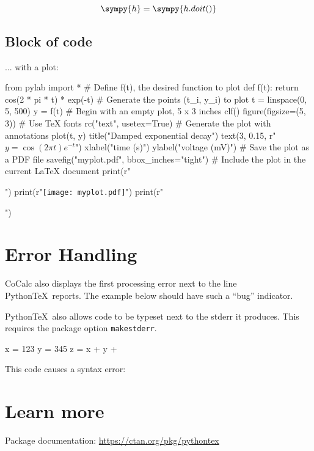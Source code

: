\documentclass{scrartcl}
\newcommand{\pytex}{Python\TeX}
\begin{document}
\[\sympy{h}=\sympy{h.doit()}\]

\pagebreak

\subsection{Block of code}

... with a plot:

\begin{pycode}
from pylab import *
# Define f(t), the desired function to plot
def f(t):
  return cos(2 * pi * t) * exp(-t)
# Generate the points (t_i, y_i) to plot
t = linspace(0, 5, 500)
y = f(t)
# Begin with an empty plot, 5 x 3 inches
clf()
figure(figsize=(5, 3))
# Use TeX fonts
rc("text", usetex=True)
# Generate the plot with annotations
plot(t, y)
title("Damped exponential decay")
text(3, 0.15, r"$y = \cos(2 \pi t) e^{-t}$")
xlabel("time (s)")
ylabel("voltage (mV)")
# Save the plot as a PDF file
savefig("myplot.pdf", bbox_inches="tight")
# Include the plot in the current LaTeX document
print(r"\begin{center}")
print(r"\texttt{[image: myplot.pdf]}")
print(r"\end{center}")
\end{pycode}

\section{Error Handling}

CoCalc also displays the first processing error next to the line \pytex\ reports.
The example below should have such a ``bug'' indicator.

\pytex\ also allows code to be typeset next to the stderr it produces.
This requires the package option \verb|makestderr|.

\begin{pyblock}[errorsession][numbers=left]
x = 123
y = 345
z = x + y +
\end{pyblock}

This code causes a syntax error:

\stderrpythontex[verbatim][frame=single]

\section{Learn more}

Package documentation: \url{https://ctan.org/pkg/pythontex}
\end{document}
